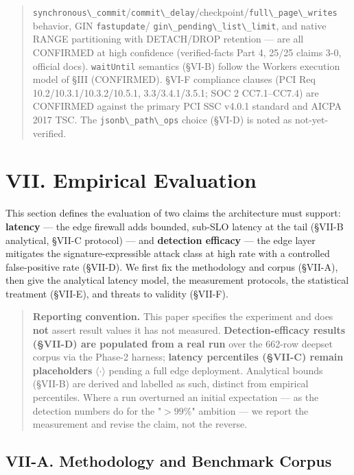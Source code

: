 \begin{quote}
\passthrough{\lstinline!synchronous\_commit!}/\passthrough{\lstinline!commit\_delay!}/checkpoint/\passthrough{\lstinline!full\_page\_writes!}
behavior, GIN \passthrough{\lstinline!fastupdate!}/
\passthrough{\lstinline!gin\_pending\_list\_limit!}, and native RANGE
partitioning with DETACH/DROP retention --- are all CONFIRMED at high
confidence (verified-facts Part 4, 25/25 claims 3-0, official docs).
\passthrough{\lstinline!waitUntil!} semantics (§VI-B) follow the Workers
execution model of §III (CONFIRMED). §VI-F compliance clauses (PCI Req
10.2/10.3.1/10.3.2/10.5.1, 3.3/3.4.1/3.5.1; SOC 2 CC7.1--CC7.4) are
CONFIRMED against the primary PCI SSC v4.0.1 standard and AICPA 2017
TSC. The \passthrough{\lstinline!jsonb\_path\_ops!} choice (§VI-D) is
noted as not-yet-verified.
\end{quote}

\section{VII. Empirical Evaluation}\label{vii-empirical-evaluation}

This section defines the evaluation of two claims the architecture must
support: \textbf{latency} --- the edge firewall adds bounded, sub-SLO
latency at the tail (§VII-B analytical, §VII-C protocol) --- and
\textbf{detection efficacy} --- the edge layer mitigates the
signature-expressible attack class at high rate with a controlled
false-positive rate (§VII-D). We first fix the methodology and corpus
(§VII-A), then give the analytical latency model, the measurement
protocols, the statistical treatment (§VII-E), and threats to validity
(§VII-F).

\begin{quote}
\textbf{Reporting convention.} This paper specifies the experiment and
does \textbf{not} assert result values it has not measured.
\textbf{Detection-efficacy results (§VII-D) are populated from a real
run} over the 662-row deepset corpus via the Phase-2 harness;
\textbf{latency percentiles (§VII-C) remain placeholders}
\(\langle\cdot\rangle\) pending a full edge deployment. Analytical
bounds (§VII-B) are derived and labelled as such, distinct from
empirical percentiles. Where a run overturned an initial expectation ---
as the detection numbers do for the "\(>99\%\)" ambition --- we report
the measurement and revise the claim, not the reverse.
\end{quote}

\subsection{VII-A. Methodology and Benchmark
Corpus}\label{vii-a-methodology-and-benchmark-corpus}


